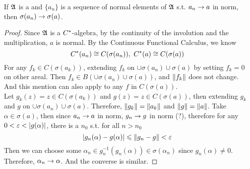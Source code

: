 \documentclass[a4paper,11pt]{report}
\begin{document}
\begin{lem}
	If $\mathfrak{A}$ is a \Cs and $\{a_n\}$ is a sequence of normal elements of $\mathfrak{A}$ s.t. $a_n \rightarrow a$ in norm, then $\sigma(a_n) \rightarrow \sigma(a)$.
\end{lem}
\begin{proof}
	Since $\mathfrak{A}$ is a $C^{*}$-algebra, by the continuity of the involution and the multiplication, $a$ is normal. By the Continuous Functional Calculus, we know
	\begin{equation*}
		C^{*}(a_n) \cong C(\sigma(a_n)),~ C^{*}(a) \cong C(\sigma(a))
	\end{equation*}
	For any $f_k \in C(\sigma(a_k))$, extending $f_k$ on $\cup \sigma(a_n) \cup \sigma(a)$ by setting $f_k = 0$ on other areal. Then $f_k \in B(\cup \sigma(a_n) \cup \sigma(a))$, and $\left\lVert f_k\right\lVert$ does not change. And this mention can also apply to any $f$ in $C(\sigma(a))$.\\
	Let $g_k(z) = z \in C(\sigma(a_k))$ and $g(z) = z \in C(\sigma(a))$, then extending $g_k$ and $g$ on $\cup \sigma(a_n) \cup \sigma(a)$. Therefore, $\left\lVert g_k\right\lVert = \left\lVert a_k\right\lVert$ and $\left\lVert g\right\lVert = \left\lVert a\right\lVert$. Take $\alpha \in \sigma(a)$, then since $a_n \rightarrow a$ in norm, $g_n \rightarrow g$ in norm (?), therefore for any $0 < \varepsilon < \left\lvert g(\alpha)\right\lvert$, there is a $n_0$ s.t. for all $n > n_0$
	\begin{equation*}
		\left\lvert g_n(\alpha)-g(\alpha)\right\lvert \leqslant \left\lVert g_n - g\right\lVert < \varepsilon
	\end{equation*}
	Then we can choose some $\alpha_n \in g_n^{-1}(g_n(\alpha)) \in \sigma(\alpha_n)$ since $g_n(\alpha) \neq 0$. Therefore, $\alpha_n \rightarrow \alpha$. And the converse is similar.
\end{proof}
\end{document}
